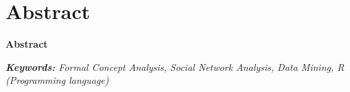 \documentclass[../main.tex]{subfiles}
\begin{document}
\makeatletter
\renewenvironment{abstract}{%
    \if@twocolumn
      \section*{Abstract \\}%
    \else %
    \begin{flushright}
        {\filleft\Huge\bfseries\fontsize{48pt}{12}\selectfont Abstract\vspace{\z@}}%
        \end{flushright}
      \quotation
    \fi}
    {\if@twocolumn\else\endquotation\fi}
\makeatother
\begin{abstract}


\noindent\textit{\textbf{Keywords:} Formal Concept Analysis, Social Network Analysis, Data Mining, R (Programming language)}
\end{abstract}
\end{document}
